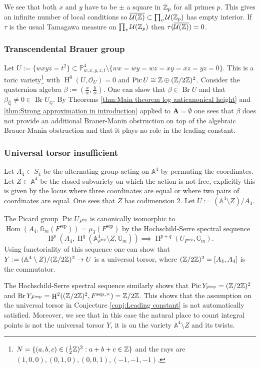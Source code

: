 \documentclass[a4paper,11pt,reqno]{amsart}
\newcommand{\Q}{\mathbb{Q}}
\newcommand{\F}{\mathbb{F}}
\newcommand{\G}{\mathbb{G}}
\newcommand{\A}{\mathbb{A}}
\newcommand{\Proj}{\mathbb{P}}
\DeclareMathOperator{\Hom}{Hom}
\DeclareMathOperator{\Pic}{Pic}
\DeclareMathOperator{\Br}{Br}
\DeclareMathOperator{\HH}{H}
\DeclareMathOperator{\sep}{sep}
\theoremstyle{definition}
\begin{document}
We see that both $x$ and $y$ have to be $\pm$ a square in $\mathbb{Z}_p$ for all primes $p$. This gives an infinite number of local conditions so $\overline{\mathcal{U}(\mathbb{Z})} \subset \prod_v \mathcal{U}(\mathbb{Z}_p)$ has empty interior. If $\tau$ is the usual Tamagawa measure on $\prod_v \mathcal{U}(\mathbb{Z}_p)$ then $\tau(\overline{\mathcal{U}(\mathbb{Z})}) = 0$.
\subsubsection{Transcendental Brauer group}\label{sec:Example transcendental Brauer group}
Let $U := \{wxyz = t^2\} \subset \Proj^4_{w,x,y,z,t} \setminus \{wx = wy = wz = xy = xz = yz = 0\}$. This is a toric variety\footnote{$N = \{(a,b,c) \in (\frac{1}{2} \mathbb{Z})^3: a + b + c \in \mathbb{Z} \}$ and the rays are $(1,0,0), (0,1,0), (0,0,1), (-1,-1,-1)$.} with $\HH^0(U, \mathcal{O}_U) = 0$ and $\Pic U \cong \Z \oplus (\Z/ 2 \Z)^2$. Consider the quaternion algebra $\beta := (\frac{x}{w}, \frac{y}{w})$. One can show that $\beta \in \Br U$ and that $\beta_{\bar{\Q}} \neq 0 \in \Br U_{\bar{\Q}}$. By Theorems \ref{thm:Main theorem log anticanonical height} and \ref{thm:Strong approximation in introduction} applied to $\mathbf{A} = \emptyset$ one sees that $\beta$ does not provide an additional Brauer-Manin obstruction on top of the algebraic Brauer-Manin obstruction and that it plays no role in the leading constant.
\subsubsection{Universal torsor insufficient}\label{sec:universal torsor insufficient}
Let $A_4 \subset S_4$ be the alternating group acting on $\A^4$ by permuting the coordinates. Let $Z \subset \A^4$ be the closed subvariety on which the action is not free, explicitly this is given by the locus where three coordinates are equal or where two pairs of coordinates are equal. One sees that $Z$ has codimension $2$. Let $U := (\A^4 \setminus Z)/A_4$.

The Picard group $\Pic U_{F^{\sep}}$ is canonically isomorphic to $\Hom(A_4, \G_m(F^{\sep})) = \mu_3(F^{\sep})$ by the Hochschild-Serre spectral sequence 
\[
\HH^p(A_4, \HH^q(\A^4_{F^{\sep}} \setminus Z, \G_m)) \implies \HH^{p + q}(U_{F^{\sep}}, \G_m).
\] Using functoriality of this sequence one can show that $Y := (\A^4 \setminus Z)/(\Z/2\Z)^2 \to U$ is a universal torsor, where $(\mathbb{Z}/2\mathbb{Z})^2 = [A_4, A_4]$ is the commutator.

The Hochschild-Serre spectral sequence similarly shows that $\Pic Y_{\F^{\sep}} = (\Z/2 \Z)^2$ and $\Br Y_{F^{\sep}} = \HH^2((\Z/2 \Z)^2, F^{\sep, \times}) = \Z/2\Z$. This shows that the assumption on the universal torsor in Conjecture \ref{conj:Leading constant} is not automatically satisfied. Moreover, we see that in this case the natural place to count integral points is not the universal torsor $Y$, it is on the variety $\A^4 \setminus Z$ and its twists.
\end{document}
